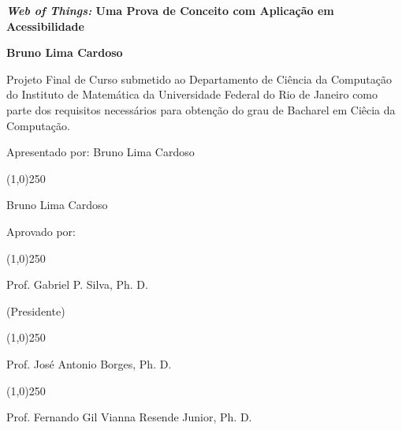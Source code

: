 \begin{titlepage}
\clearpage
\bigskip


\bigskip



\bigskip

\centerline{\textbf{\large \emph{Web of Things:} Uma Prova de Conceito com Aplicação em Acessibilidade}}


\bigskip


\bigskip

\centerline{\textbf{Bruno Lima Cardoso}}



\bigskip


\bigskip

Projeto Final de Curso submetido ao Departamento de Ci\^encia da Computa\c{c}\~ao do Instituto de Matem\'atica da Universidade Federal do Rio de Janeiro como parte dos requisitos necess\'arios para obten\c{c}\~ao do grau de Bacharel em Ciêcia da Computação.


\bigskip

Apresentado por: Bruno Lima Cardoso


\bigskip


\hfill
\line(1,0){250}

\hfill
Bruno Lima Cardoso

\bigskip

\hfil
Aprovado por:

\bigskip

\bigskip

\hfill
\line(1,0){250}

\hfill
Prof. Gabriel P. Silva, Ph. D.

\hfill
(Presidente)

\bigskip

\bigskip

\bigskip

\hfill
\line(1,0){250}

\hfill
Prof. José Antonio Borges, Ph. D.

\bigskip

\bigskip

\bigskip

\hfill
\line(1,0){250} 

\hfill
Prof. Fernando Gil Vianna Resende Junior, Ph. D.

\bigskip

\bigskip

\bigskip

\bigskip


\end{titlepage}
